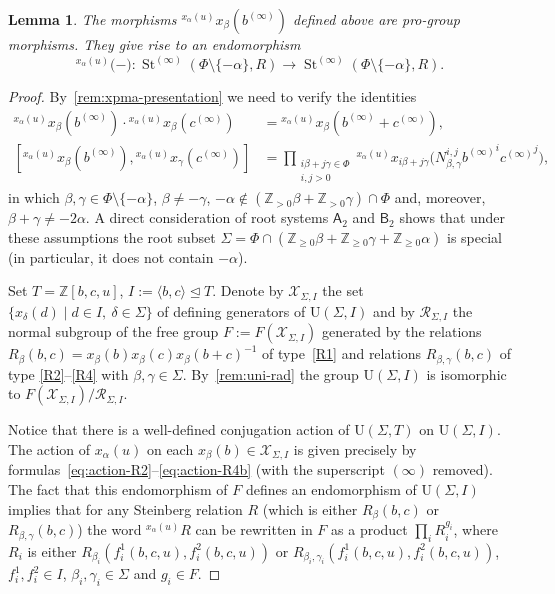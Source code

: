 \documentclass[oneside, 11pt]{amsart}
\numberwithin{equation}{section}
\newtheorem{lemma}{Lemma} \numberwithin{lemma}{section}
\theoremstyle{definition}
\theoremstyle{remark}
\DeclareMathOperator\St{St}
\newcommand{\ZZ}{\mathbb{Z}}
\newcommand{\up}[2]{{^{#1}\!{#2}}}
\newcommand{\rA}{\mathsf{A}}
\newcommand{\rB}{\mathsf{B}}
\begin{document}
\begin{lemma} \label{endomor-elim}
 The morphisms $\up{x_\alpha(u)}x_\beta(b^{(\infty)})$ defined above are pro-group morphisms. They give rise to an endomorphism 
 \[\up{x_\alpha(u)}(-) \colon \St^{(\infty)}(\Phi\setminus\{-\alpha\}, R) \to \St^{(\infty)}(\Phi\setminus\{-\alpha\}, R).\]
\end{lemma}
\begin{proof}
 By~\cref{rem:xpma-presentation} we need to verify the identities
 \begin{align}
 \up{x_\alpha(u)} x_\beta(b^{(\infty)}) \cdot \up{x_\alpha(u)} x_\beta(c^{(\infty)}) & = \up{x_\alpha(u)} x_\beta(b^{(\infty)} + c^{(\infty)}), \label{eq:additivity} \\
 [\up{x_\alpha(u)}{x_\beta(b^{(\infty)})}, \up{x_\alpha(u)}{x_\gamma(c^{(\infty)})}] & = \prod_{\substack{i\beta + j\gamma \in \Phi\\ i, j > 0}} \up{x_\alpha(u)}{x_{i\beta + j\gamma}\bigl(N_{\beta, \gamma}^{i, j} {b^{(\infty)}}^i {c^{(\infty)}}^j \bigr)}, \label{eq:main-equation} \end{align}
 in which \(\beta, \gamma \in \Phi \setminus \{- \alpha\}\), $\beta \neq -\gamma$, $-\alpha\not\in(\ZZ_{>0}\beta + \ZZ_{>0}\gamma) \cap \Phi$ and, moreover,
  $\beta+\gamma\neq -2\alpha$. A direct consideration of root systems $\rA_2$ and $\rB_2$ shows that under these assumptions the root subset $\Sigma = \Phi\cap (\ZZ_{\geq 0}\beta + \ZZ_{\geq 0}\gamma + \ZZ_{\geq 0}\alpha)$ is special (in particular, it does not contain $-\alpha$).
  
 Set $T = \ZZ[b,c,u]$, $I := \langle b, c \rangle \trianglelefteq T$. Denote by $\mathcal{X}_{\Sigma, I}$ the set $\{ x_\delta(d) \mid d\in I,\ \delta\in\Sigma \}$ of defining generators of $\mathrm{U}(\Sigma, I)$ and by $\mathcal{R}_{\Sigma, I}$ the normal subgroup of the free group $F:=F(\mathcal{X}_{\Sigma, I})$ generated by the relations $R_\beta(b, c) = x_\beta(b)x_\beta(c)x_\beta(b + c)^{-1}$ of type~\eqref{R1} and relations $R_{\beta,\gamma}(b,c)$ of type \eqref{R2}--\eqref{R4} with $\beta,\gamma \in \Sigma$. By~\cref{rem:uni-rad} the group $\mathrm{U}(\Sigma, I)$ is isomorphic to $F(\mathcal{X}_{\Sigma, I})/\mathcal{R}_{\Sigma, I}$.
 
 Notice that there is a well-defined conjugation action of $\mathrm{U}(\Sigma, T)$ on $\mathrm{U}(\Sigma, I)$. The action of $x_\alpha(u)$ on each $x_\beta(b) \in \mathcal{X}_{\Sigma, I}$ is given precisely by formulas~\eqref{eq:action-R2}--\eqref{eq:action-R4b} (with the superscript $(\infty)$ removed). The fact that this endomorphism of $F$ defines an endomorphism of $\mathrm{U}(\Sigma, I)$ implies that for any Steinberg relation $R$ (which is either $R_\beta(b,c)$ or $R_{\beta,\gamma}(b,c)$) the word $\up{x_\alpha(u)}R$ can be rewritten in $F$ as a product $\prod_i R_i^{g_i}$, where $R_i$ is either $R_{\beta_i}(f_{i}^1(b,c,u), f_{i}^2(b,c,u))$ or $R_{\beta_i,\gamma_i}(f^{1}_i(b,c,u), f^{2}_i(b,c,u))$, $f^1_i, f^2_i \in I$, $\beta_i, \gamma_i \in \Sigma$ and $g_i \in F$.
 

\end{proof}
\end{document}
